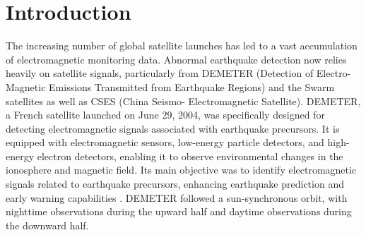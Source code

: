 \documentclass[3p,authoryear,preprint,12pt]{elsarticle}
\begin{document}
    
\section{Introduction}
The increasing number of global satellite launches has led to a vast accumulation of electromagnetic monitoring data. Abnormal earthquake detection now relies heavily on satellite signals, particularly from DEMETER (Detection of Electro-Magnetic Emissions Transmitted from Earthquake Regions) and the Swarm satellites {as well as CSES (China Seismo-
Electromagnetic Satellite)}\citep{zhaoPreliminaryAnalysisIonospheric2022}. DEMETER, a French satellite launched on June 29, 2004, {was} specifically designed for detecting electromagnetic signals associated with earthquake precursors. It is equipped with electromagnetic sensors, low-energy particle detectors, and high-energy electron detectors, enabling {it to observe} environmental changes in the ionosphere and magnetic field. Its main objective {was} to identify electromagnetic signals related to earthquake precursors, enhancing earthquake prediction and early warning capabilities{ }\citep{shiUnsupervisedAnomalyDetection2023}. DEMETER {followed} a sun-synchronous orbit, with nighttime observations during the upward half and daytime observations during the downward half.
\end{document}
